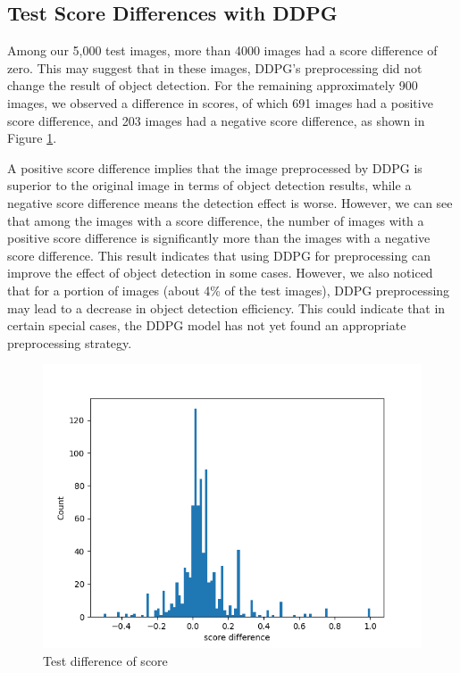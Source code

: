 \documentclass{PHlab-thesis}
\begin{document}
\subsection{Test Score Differences with DDPG}
Among our 5,000 test images, more than 4000 images had a score difference of zero. This may suggest that in these images, DDPG's preprocessing did not change the result of object detection. For the remaining approximately 900 images, we observed a difference in scores, of which 691 images had a positive score difference, and 203 images had a negative score difference, as shown in Figure \ref{Fig.Test difference of score}.

A positive score difference implies that the image preprocessed by DDPG is superior to the original image in terms of object detection results, while a negative score difference means the detection effect is worse. However, we can see that among the images with a score difference, the number of images with a positive score difference is significantly more than the images with a negative score difference. This result indicates that using DDPG for preprocessing can improve the effect of object detection in some cases. However, we also noticed that for a portion of images (about 4\% of the test images), DDPG preprocessing may lead to a decrease in object detection efficiency. This could indicate that in certain special cases, the DDPG model has not yet found an appropriate preprocessing strategy.

\begin{figure}[H] 
    \centering 
    \includegraphics[width=\textwidth]{images/test difference of score.png}
    \caption{Test difference of score} 
    \label{Fig.Test difference of score} 
\end{figure}
\end{document}
